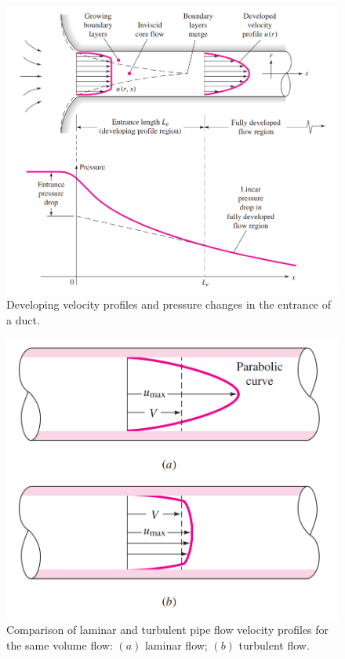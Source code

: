 \documentclass[10pt]{article} %
\numberwithin{equation}{section} %
\begin{document}
\begin{multicols}{2}
\begin{figure}[!htb] %
\centering
\includegraphics[scale=0.46]{developing_velocity_profile}
\caption{Developing velocity profiles and pressure changes in the entrance of a duct.}
\label{fig:developing-velocity-profile}
\end{figure}
\begin{figure}[!htb]
\centering
\includegraphics[scale=0.35]{comparing_velocity_profiles}
\caption{Comparison of laminar and turbulent pipe flow velocity profiles for the same volume flow: $(a)$ laminar flow; $(b)$ turbulent flow.}
\label{fig:comparing-velocity-profiles}
\end{figure}


\end{multicols}
\end{document}
